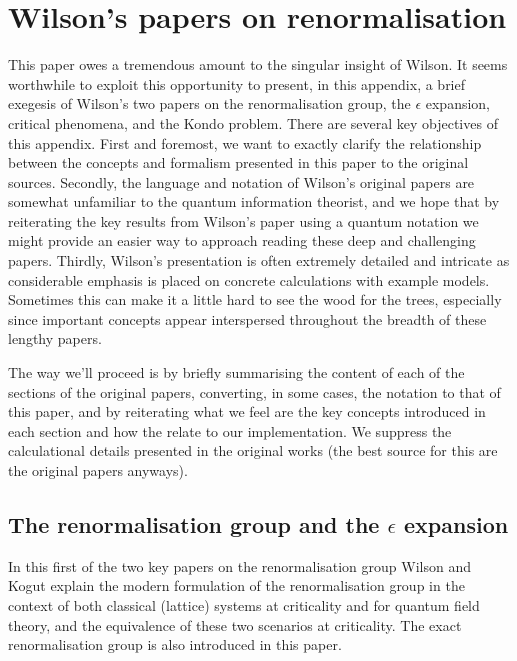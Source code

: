 \documentclass[11pt]{amsart}
\theoremstyle{plain}%
\theoremstyle{definition}
\theoremstyle{remark}
\begin{document}


\appendix
\section{Wilson's papers on renormalisation}
This paper owes a tremendous amount to the singular insight of Wilson. It seems worthwhile to exploit this opportunity to present, in this appendix, a brief exegesis of Wilson's two papers \cite{wilson_renormalization_1974,wilson_renormalization_1975} on the renormalisation group, the $\epsilon$ expansion, critical phenomena, and the Kondo problem. There are several key objectives of this appendix. First and foremost, we want to exactly clarify the relationship between the concepts and formalism presented in this paper to the original sources. Secondly, the language and notation of Wilson's original papers are somewhat unfamiliar to the quantum information theorist, and we hope that by reiterating the key results from Wilson's paper using a quantum notation we might provide an easier way to approach reading these deep and challenging papers. Thirdly, Wilson's presentation is often extremely detailed and intricate as considerable emphasis is placed on concrete calculations with example models. Sometimes this can make it a little hard to see the wood for the trees, especially since important concepts appear interspersed throughout the breadth of these lengthy papers. 

The way we'll proceed is by briefly summarising the content of each of the sections of the original papers, converting, in some cases, the notation to that of this paper, and by reiterating what we feel are the key concepts introduced in each section and how the relate to our implementation. We suppress the calculational details presented in the original works (the best source for this are the original papers anyways).

\subsection{The renormalisation group and the $\epsilon$ expansion}
In this first of the two key papers on the renormalisation group Wilson and Kogut explain the modern formulation of the renormalisation group in the context of both classical (lattice) systems at criticality and for quantum field theory, and the equivalence of these two scenarios at criticality. The exact renormalisation group is also introduced in this paper. 
\end{document}
